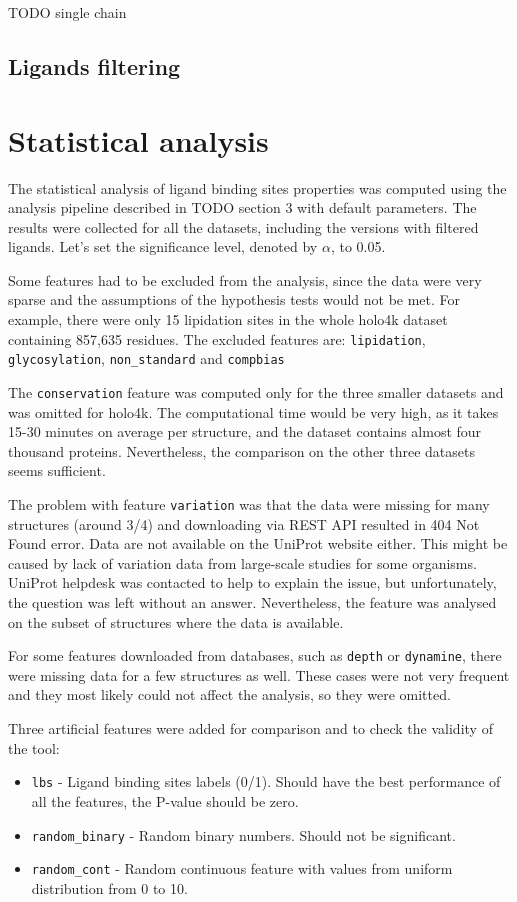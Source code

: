 TODO single chain

\subsection{Ligands filtering}

\section{Statistical analysis}

The statistical analysis of ligand binding sites properties was computed using the analysis pipeline described in TODO section 3 with default parameters. The results were collected for all the datasets, including the versions with filtered ligands. Let's set the significance level, denoted by $\alpha$, to 0.05.

Some features had to be excluded from the analysis, since the data were very sparse and the assumptions of the hypothesis tests would not be met. For example, there were only 15 lipidation sites in the whole holo4k dataset containing  857,635 residues. The excluded features are: \texttt{lipidation}, \texttt{glycosylation}, \texttt{non\_standard} and \texttt{compbias}

The \texttt{conservation} feature was computed only for the three smaller datasets and was omitted for holo4k. The computational time would be very high, as it takes 15-30 minutes on average per structure, and the dataset contains almost four thousand proteins. Nevertheless, the comparison on the other three datasets seems sufficient.

The problem with feature \texttt{variation} was that the data were missing for many structures (around 3/4) and downloading via REST API resulted in 404 Not Found error. Data are not available on the UniProt website either. This might be caused by lack of variation data from large-scale studies for some organisms. UniProt helpdesk was contacted to help to explain the issue, but unfortunately, the question was left without an answer. Nevertheless, the feature was analysed on the subset of structures where the data is available.

For some features downloaded from databases, such as \texttt{depth} or \texttt{dynamine}, there were missing data for a few structures as well. These cases were not very frequent and they most likely could not affect the analysis, so they were omitted.

Three artificial features were added for comparison and to check the validity of the tool:
\begin{itemize}
  \item \texttt{lbs} - Ligand binding sites labels (0/1). Should have the best performance of all the features, the P-value should be zero.
  \item \texttt{random\_binary} - Random binary numbers. Should not be significant.
  \item \texttt{random\_cont} - Random continuous feature with values from uniform distribution from 0 to 10.
\end{itemize}

